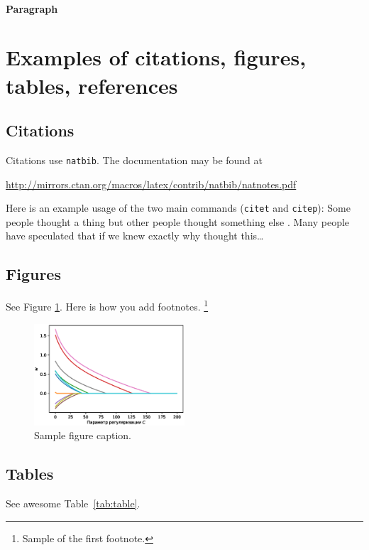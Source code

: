 \documentclass{article}
\begin{document}
\paragraph{Paragraph}
\lipsum[7]



\section{Examples of citations, figures, tables, references}
\label{sec:others}

\subsection{Citations}
Citations use \verb+natbib+. The documentation may be found at
\begin{center}
	\url{http://mirrors.ctan.org/macros/latex/contrib/natbib/natnotes.pdf}
\end{center}

Here is an example usage of the two main commands (\verb+citet+ and \verb+citep+): Some people thought a thing \citep{kour2014real, hadash2018estimate} but other people thought something else \citep{kour2014fast}. Many people have speculated that if we knew exactly why \citet{kour2014fast} thought this\dots

\subsection{Figures}
\lipsum[10]
See Figure \ref{fig:fig1}. Here is how you add footnotes. \footnote{Sample of the first footnote.}
\lipsum[11]

\begin{figure}
	\centering
	\includegraphics[width=0.5\textwidth]{../figures/log_reg_cs_exp.eps}
	\caption{Sample figure caption.}
	\label{fig:fig1}
\end{figure}

\subsection{Tables}
See awesome Table~\ref{tab:table}.
\end{document}
